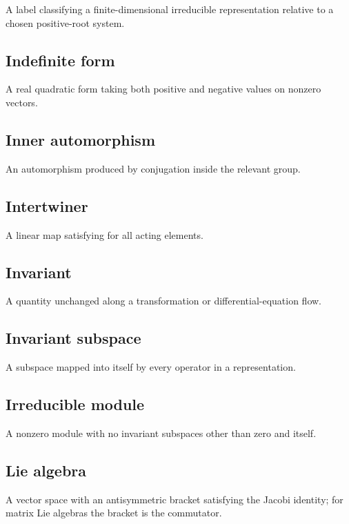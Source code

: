 \documentclass[11pt]{article}
\begin{document}
A label classifying a finite-dimensional irreducible representation relative to a chosen positive-root system.

\subsection{Indefinite form}

A real quadratic form taking both positive and negative values on nonzero vectors.

\subsection{Inner automorphism}

An automorphism produced by conjugation inside the relevant group.

\subsection{Intertwiner}

A linear map \texttt{} satisfying \texttt{} for all acting elements.

\subsection{Invariant}

A quantity unchanged along a transformation or differential-equation flow.

\subsection{Invariant subspace}

A subspace mapped into itself by every operator in a representation.

\subsection{Irreducible module}

A nonzero module with no invariant subspaces other than zero and itself.

\subsection{Lie algebra}

A vector space with an antisymmetric bracket satisfying the Jacobi identity; for matrix Lie algebras the bracket is the commutator.
\end{document}
